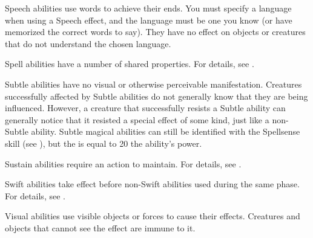  Speech abilities use words to achieve their ends.
You must specify a language when using a Speech effect, and the language must be one you know (or have memorized the correct words to say). They have no effect on objects or creatures that do not understand the chosen language.

 Spell abilities have a number of shared properties.
For details, see .

 Subtle abilities have no visual or otherwise perceivable manifestation.
Creatures successfully affected by Subtle abilities do not generally know that they are being influenced.
However, a creature that successfully resists a Subtle ability can generally notice that it resisted a special effect of some kind, just like a non-Subtle ability.
Subtle magical abilities can still be identified with the Spellsense skill (see ), but the  is equal to 20 \add the ability's power.

 Sustain abilities require an action to maintain. For details, see .

 Swift abilities take effect before non-Swift abilities used during the same phase.
For details, see .

 Visual abilities use visible objects or forces to cause their effects.
Creatures and objects that cannot see the effect are immune to it.
